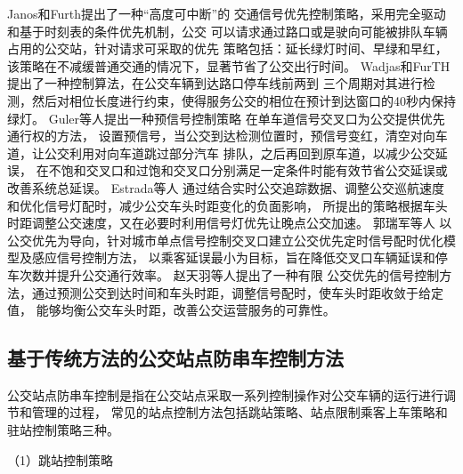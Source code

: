 Janos和Furth\cite{janos2002bus}提出了一种“高度可中断”的
交通信号优先控制策略，采用完全驱动和基于时刻表的条件优先机制，公交
可以请求通过路口或是驶向可能被排队车辆占用的公交站，针对请求可采取的优先
策略包括：延长绿灯时间、早绿和早红，该策略在不减缓普通交通的情况下，显著节省了公交出行时间。
Wadjas和FurTH\cite{wadjas2003transit}提出了一种控制算法，在公交车辆到达路口停车线前两到
三个周期对其进行检测，然后对相位长度进行约束，使得服务公交的相位在预计到达窗口的40秒内保持绿灯。
Guler等人\cite{guler2015providing}提出一种预信号控制策略
在单车道信号交叉口为公交提供优先通行权的方法，
设置预信号，当公交到达检测位置时，预信号变红，清空对向车道，让公交利用对向车道跳过部分汽车
排队，之后再回到原车道，以减少公交延误，
在不饱和交叉口和过饱和交叉口分别满足一定条件时能有效节省公交延误或改善系统总延误。
Estrada等人\cite{estrada2016bus}
通过结合实时公交追踪数据、调整公交巡航速度和优化信号灯配时，减少公交车头时距变化的负面影响，
所提出的策略根据车头时距调整公交速度，又在必要时利用信号灯优先让晚点公交加速。
郭瑞军等人\cite{郭瑞军2019基于乘客延误的公交优先信号交叉口优化模型}
以公交优先为导向，针对城市单点信号控制交叉口建立公交优先定时信号配时优化模型及感应信号控制方法，
以乘客延误最小为目标，旨在降低交叉口车辆延误和停车次数并提升公交通行效率。
赵天羽等人\cite{赵天羽2020考虑到站时间可靠性的有限公交优先信号控制}提出了一种有限
公交优先的信号控制方法，通过预测公交到达时间和车头时距，调整信号配时，使车头时距收敛于给定值，
能够均衡公交车头时距，改善公交运营服务的可靠性。

\subsection{基于传统方法的公交站点防串车控制方法}
公交站点防串车控制是指在公交站点采取一系列控制操作对公交车辆的运行进行调节和管理的过程，
常见的站点控制方法包括跳站策略、站点限制乘客上车策略和驻站控制策略三种。

（1）跳站控制策略

